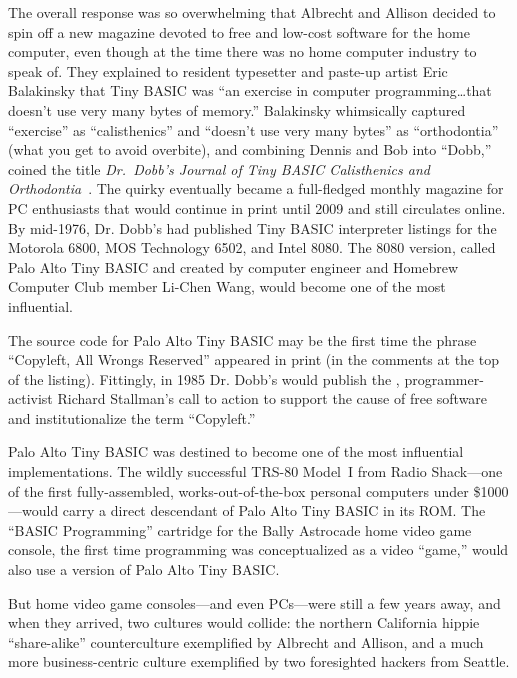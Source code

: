 The overall response was so overwhelming that Albrecht and Allison
decided to spin off a new magazine devoted to free and low-cost software
for the home computer, even though at the time there was no home
computer industry to speak of.
They explained to resident typesetter
and paste-up artist Eric Balakinsky that Tiny BASIC was ``an exercise in
computer programming\ldots{}that doesn't use very many bytes of
memory.''
Balakinsky whimsically captured ``exercise'' as
``calisthenics'' and ``doesn't use very many bytes'' as ``orthodontia''
(what you get to avoid overbite), and combining Dennis and Bob into
``Dobb,'' coined the title \emph{Dr.~Dobb's Journal of Tiny BASIC
Calisthenics and Orthodontia}~\cite[p.~265]{dormouse}.
The quirky  eventually became a
full-fledged monthly magazine for PC enthusiasts that
would continue in print until 2009 and still circulates online.
By mid-1976, Dr. Dobb's had published Tiny BASIC interpreter listings
for the Motorola 6800, MOS Technology 6502, and Intel 8080.
The 8080
version, called Palo Alto Tiny BASIC and created by computer engineer
and Homebrew Computer Club member Li-Chen Wang, would become one of the
most influential.

\begin{tangent}
The source code for Palo Alto Tiny BASIC may be the first time
the phrase ``Copyleft, All Wrongs Reserved'' appeared in print (in the
comments at the top of the listing).
Fittingly, in 1985 Dr. Dobb's would publish the ,
programmer-activist Richard Stallman's call to action to support the
cause of free software and institutionalize the term ``Copyleft.''
\end{tangent}

Palo Alto Tiny BASIC was destined to become one of the most influential
implementations. 
The wildly successful TRS-80 Model~I from Radio Shack---one of the first 
fully-assembled, works-out-of-the-box  
personal computers under \$1000---would carry a direct descendant of
Palo Alto Tiny BASIC in its ROM.
The ``BASIC Programming'' cartridge for the Bally Astrocade
home video game console, the first time programming
was conceptualized as a video ``game,''
would also use a version of Palo Alto Tiny
BASIC.

But home video game consoles---and even PCs---were still a few years
away, and when they arrived, two cultures would collide: the northern
California hippie ``share-alike'' counterculture exemplified by Albrecht
and Allison, and a much more business-centric culture exemplified by
two foresighted hackers from Seattle.




